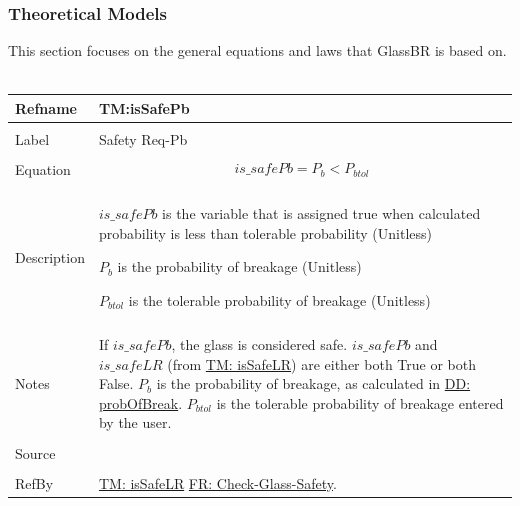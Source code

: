 \documentclass[12pt]{article}
\begin{document}
\subsubsection{Theoretical Models}
\label{Sec:TMs}
This section focuses on the general equations and laws that GlassBR is based on.
~\newline
\noindent \begin{minipage}{\textwidth}
\begin{tabular}{p{} p{}}
\toprule \textbf{Refname} & \textbf{TM:isSafePb}
\label{TM:isSafePb}
\\ \midrule \\
Label & Safety Req-Pb
\\ \midrule \\
Equation & \begin{dmath}
           is\_safePb={P_{b}}<{P_{btol}}
           \end{dmath}
\\ \midrule \\
Description & \begin{symbDescription}
              \item{$is\_safePb$ is the variable that is assigned true when calculated probability is less than tolerable probability (Unitless)}
              \item{${P_{b}}$ is the probability of breakage (Unitless)}
              \item{${P_{btol}}$ is the tolerable probability of breakage (Unitless)}
              \end{symbDescription}
\\ \midrule \\
Notes & If $is\_safePb$, the glass is considered safe. $is\_safePb$ and $is\_safeLR$ (from \hyperref[TM:isSafeLR]{TM: isSafeLR}) are either both True or both False. ${P_{b}}$ is the probability of breakage, as calculated in \hyperref[DD:probOfBreak]{DD: probOfBreak}. ${P_{btol}}$ is the tolerable probability of breakage entered by the user.
\\ \midrule \\
Source & \cite{astm2009}
\\ \midrule \\
RefBy & \hyperref[TM:isSafeLR]{TM: isSafeLR} \hyperref[checkGlassSafety]{FR: Check-Glass-Safety}.
\\ \bottomrule \end{tabular}
\end{minipage}\\
\end{document}
